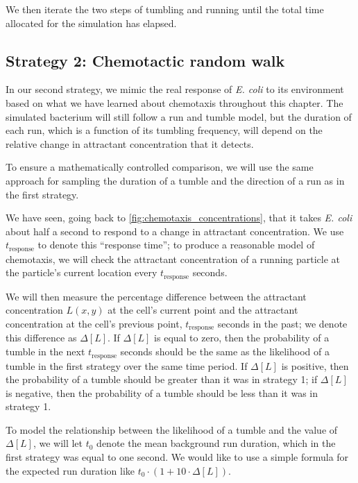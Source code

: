 We then iterate the two steps of tumbling and running until the total time allocated for the simulation has elapsed.

\FloatBarrier
{}
\subsection{Strategy 2: Chemotactic random walk}

In our second strategy, we mimic the real response of \textit{E. coli} to its environment based on what we have learned about chemotaxis throughout this chapter. The simulated bacterium will still follow a run and tumble model, but the duration of each run, which is a function of its tumbling frequency, will depend on the relative change in attractant concentration that it detects.

To ensure a mathematically controlled comparison, we will use the same approach for sampling the duration of a tumble and the direction of a run as in the first strategy.

We have seen, going back to \autoref{fig:chemotaxis_concentrations}, that it takes \textit{E. coli} about half a second to respond to a change in attractant concentration. We use $t_{\text{response}}$ to denote this ``response time''; to produce a reasonable model of chemotaxis, we will check the attractant concentration of a running particle at the particle's current location every $t_{\text{response}}$ seconds.

We will then measure the percentage difference between the attractant concentration $L(x,y)$ at the cell's current point and the attractant concentration at the cell's previous point, $t_{\text{response}}$ seconds in the past; we denote this difference as $\Delta[L]$. If $\Delta[L]$ is equal to zero, then the probability of a tumble in the next $t_{\text{response}}$ seconds should be the same as the likelihood of a tumble in the first strategy over the same time period. If $\Delta[L]$ is positive, then the probability of a tumble should be greater than it was in strategy 1; if $\Delta[L]$ is negative, then the probability of a tumble should be less than it was in strategy 1.

To model the relationship between the likelihood of a tumble and the value of $\Delta[L]$, we will let $t_0$ denote the mean background run duration, which in the first strategy was equal to one second. We would like to use a simple formula for the expected run duration like $t_0 \cdot (1 + 10 \cdot \Delta[L])$.

